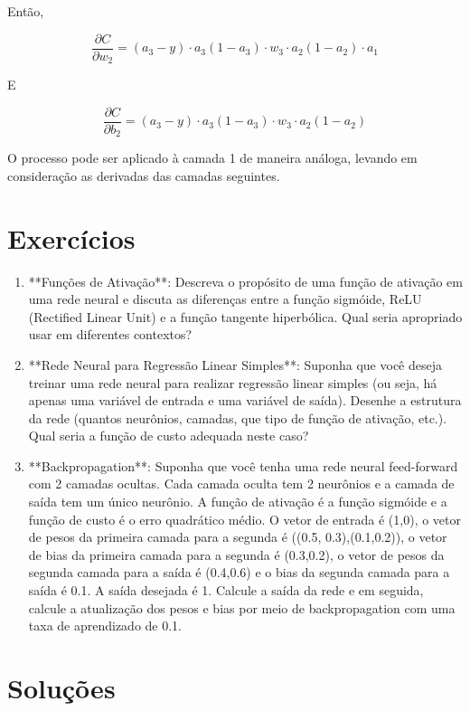 \documentclass[12pt,a4paper, brazil]{article}
\begin{document}
\noindent Então,

$$\frac{\partial C}{\partial w_2} = (a_3 - y) \cdot a_3(1 - a_3) \cdot w_3 \cdot a_2(1 - a_2) \cdot a_1$$

\noindent E

$$\frac{\partial C}{\partial b_2} = (a_3 - y) \cdot a_3(1 - a_3) \cdot w_3 \cdot a_2(1 - a_2)$$

\noindent  O processo pode ser aplicado à camada 1 de maneira análoga, levando em consideração as derivadas das camadas seguintes.

\section{Exercícios}

\begin{enumerate}

\item  **Funções de Ativação**: Descreva o propósito de uma função de ativação em uma rede neural e discuta as diferenças entre a função sigmóide, ReLU (Rectified Linear Unit) e a função tangente hiperbólica. Qual seria apropriado usar em diferentes contextos?

\item  **Rede Neural para Regressão Linear Simples**: Suponha que você deseja treinar uma rede neural para realizar regressão linear simples (ou seja, há apenas uma variável de entrada e uma variável de saída). Desenhe a estrutura da rede (quantos neurônios, camadas, que tipo de função de ativação, etc.). Qual seria a função de custo adequada neste caso?

\item **Backpropagation**: Suponha que você tenha uma rede neural feed-forward com 2 camadas ocultas. Cada camada oculta tem 2 neurônios e a camada de saída tem um único neurônio. A função de ativação é a função sigmóide e a função de custo é o erro quadrático médio. O vetor de entrada é (1,0), o vetor de pesos da primeira camada para a segunda é ((0.5, 0.3),(0.1,0.2)), o vetor de bias da primeira camada para a segunda é (0.3,0.2), o vetor de pesos da segunda camada para a saída é (0.4,0.6) e o bias da segunda camada para a saída é 0.1. A saída desejada é 1. Calcule a saída da rede e em seguida, calcule a atualização dos pesos e bias por meio de backpropagation com uma taxa de aprendizado de 0.1.

\end{enumerate}

\section{Soluções}
\end{document}
